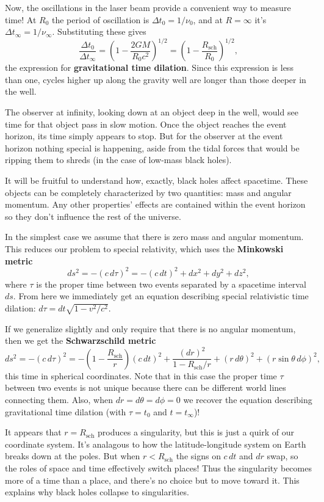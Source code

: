 \documentclass[../a062main.tex]{subfiles}
\begin{document}
Now, the oscillations in the laser beam provide a convenient way to measure time!
At $R_0$ the period of oscillation is $\Delta t_0 = 1 / \nu_0$, and at $R = \infty$ it's $\Delta t_\infty = 1 / \nu_\infty$.
Substituting these gives
\[ \boxed{\frac{\Delta t_0}{\Delta t_\infty} = \left( 1 - \frac{2GM}{R_0c^2} \right)^{1 / 2} = \left( 1 - \frac{R_\textrm{sch}}{R_0} \right)^{1 / 2}}, \]
the expression for \textbf{gravitational time dilation}.
Since this expression is less than one, cycles higher up along the gravity well are longer than those deeper in the well.

The observer at infinity, looking down at an object deep in the well, would see time for that object pass in slow motion.
Once the object reaches the event horizon, its time simply appears to stop.
But for the observer at the event horizon nothing special is happening, aside from the tidal forces that would be ripping them to shreds (in the case of low-mass black holes).

It will be fruitful to understand how, exactly, black holes affect spacetime.
These objects can be completely characterized by two quantities: mass and angular momentum.
Any other properties' effects are contained within the event horizon so they don't influence the rest of the universe.

In the simplest case we assume that there is zero mass and angular momentum.
This reduces our problem to special relativity, which uses the \textbf{Minkowski metric}
\[ ds^2 = -(c\,d\tau)^2 = -(c\,dt)^2 + dx^2 + dy^2 + dz^2, \]
where $\tau$ is the proper time between two events separated by a spacetime interval $ds$.
From here we immediately get an equation describing special relativistic time dilation: $d\tau = dt \sqrt{1 - v^2 / c^2}$.

If we generalize slightly and only require that there is no angular momentum, then we get the \textbf{Schwarzschild metric}
\[ ds^2 = -(c\,d\tau)^2 = -\left( 1 - \frac{R_\textrm{sch}}{r} \right)(c\,dt)^2 + \frac{(dr)^2}{1 - R_\textrm{sch} / r} + (r\,d\theta)^2 + (r\sin\theta\,d\phi)^2, \]
this time in spherical coordinates.
Note that in this case the proper time $\tau$ between two events is not unique because there can be different world lines connecting them.
Also, when $dr = d\theta = d\phi = 0$ we recover the equation describing gravitational time dilation (with $\tau = t_0$ and $t = t_\infty$)!

It appears that $r = R_\textrm{sch}$ produces a singularity, but this is just a quirk of our coordinate system.
It's analagous to how the latitude-longitude system on Earth breaks down at the poles.
But when $r < R_\textrm{sch}$ the signs on $c\,dt$ and $dr$ swap, so the roles of space and time effectively switch places!
Thus the singularity becomes more of a time than a place, and there's no choice but to move toward it.
This explains why black holes collapse to singularities.
\end{document}
